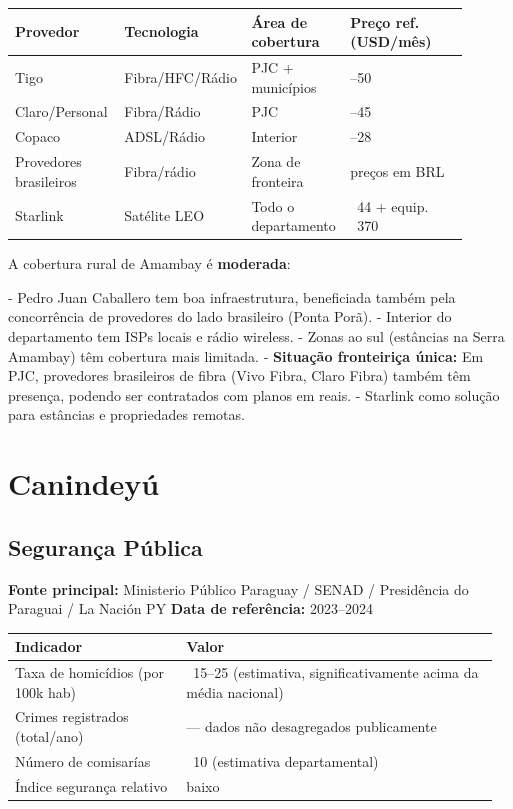 {\small
\setlength{\tabcolsep}{3pt}
\renewcommand{\arraystretch}{1.12}
\begin{tabularx}{\linewidth}{>{\raggedright\arraybackslash}p{0.24\linewidth} >{\raggedright\arraybackslash}p{0.22\linewidth} >{\raggedright\arraybackslash}p{0.18\linewidth} >{\raggedright\arraybackslash}p{0.26\linewidth}}
\toprule
Provedor & Tecnologia & Área de cobertura & Preço ref. (USD/mês) \\
\midrule
Tigo & Fibra/HFC/Rádio & PJC + municípios & 18--50 \\
Claro/Personal & Fibra/Rádio & PJC & 15--45 \\
Copaco & ADSL/Rádio & Interior & 10--28 \\
Provedores brasileiros & Fibra/rádio & Zona de fronteira & preços em BRL \\
Starlink & Satélite LEO & Todo o departamento & ~44 + equip. ~370 \\
\bottomrule
\end{tabularx}
}


A cobertura rural de Amambay é \textbf{moderada}:

- Pedro Juan Caballero tem boa infraestrutura, beneficiada também pela concorrência de provedores do lado brasileiro (Ponta Porã).
- Interior do departamento tem ISPs locais e rádio wireless.
- Zonas ao sul (estâncias na Serra Amambay) têm cobertura mais limitada.
- \textbf{Situação fronteiriça única:} Em PJC, provedores brasileiros de fibra (Vivo Fibra, Claro Fibra) também têm presença, podendo ser contratados com planos em reais.
- Starlink como solução para estâncias e propriedades remotas.





\clearpage
\section{Canindeyú}
\label{sec:dept_14_Canindeyu}

\subsection{Segurança Pública}

\textbf{Fonte principal:} Ministerio Público Paraguay / SENAD / Presidência do Paraguai / La Nación PY
\textbf{Data de referência:} 2023--2024


{\small
\setlength{\tabcolsep}{3pt}
\renewcommand{\arraystretch}{1.12}
\begin{tabularx}{\linewidth}{>{\raggedright\arraybackslash}p{0.34\linewidth} >{\raggedright\arraybackslash}p{0.62\linewidth}}
\toprule
Indicador & Valor \\
\midrule
Taxa de homicídios (por 100k hab) & ~15--25 (estimativa, significativamente acima da média nacional) \\
Crimes registrados (total/ano) & --- dados não desagregados publicamente \\
Número de comisarías & ~10 (estimativa departamental) \\
Índice segurança relativo & baixo \\
\bottomrule
\end{tabularx}
}


